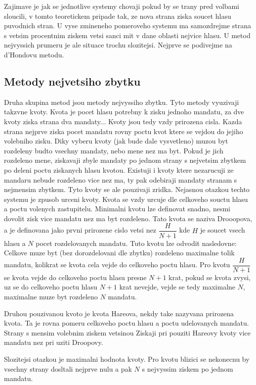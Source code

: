 \documentclass[12pt,a4paper]{report}
\begin{document}
Zajimave je jak se jednotlive systemy chovaji pokud by se trany pred volbami sloucili, v tomto teoretickem pripade tak, ze nova strana ziska soucet hlasu puvodnich stran.
U vyse zmineneho pomeroveho systemu ma samozdrejme strana s vetsim procentnim ziskem vetsi sanci mit v dane oblasti nejvice hlasu.
U metod nejvyssich prumeru je ale situace trochu slozitejsi.
Nejprve se podivejme na d'Hondovu metodu.




\subsection{Metody nejvetsiho zbytku}
Druha skupina metod jsou metody nejvyssiho zbytku.
Tyto metody vyuzivaji takzvne kvoty.
Kvota je pocet hlasu potrebny k zisku jednoho mandatu, za dve kvoty ziska strana dva mandaty...
Kvoty jsou tedy vzdy prirozena cisla.
Kazda strana nejprve ziska pocet mandatu rovny poctu kvot ktere se vejdou do jejiho volebniho zisku.
Diky vyberu kvoty (jak bude dale vysvetleno) muzou byt rozdeleny budto vsechny mandaty, nebo mene nez ma byt.
Pokud je jich rozdeleno mene, ziskavaji zbyle mandaty po jednom strany s nejvetsim zbytkem po deleni poctu ziskanych hlasu kvotou.
Existuji i kvoty ktere nezarucuji ze mandaru nebude rozdeleno vice nez ma, ty pak odebiraji mandaty stranam s nejmensim zbytkem.
Tyto kvoty se ale pouzivaji zridka.
Nejasnou otazkou techto systemu je zpusob urceni kvoty.
Kvota se vzdy urcuje dle celkoveho souctu hlasu a poctu volenych zastupitelu.
Minimalni kvotu lze definovat snadno, nesmi dovolit zisk vice mandatu nez ma byt rozdeleno.
Tato kvota se naziva Drooopova, a je definovana jako prvni prirozene cislo vetsi nez $\dfrac{H}{N+1}$ kde $H$ je soucet vsech hlasu a $N$ pocet rozdelovanych mandatu.
Tuto kvotu lze odvodit nasledovne: Celkove muze byt (bez dorozdelovani dle zbytku) rozdeleno maximalne tolik mandatu, kolikrat se kvota cela vejde do celkoveho poctu hlasu.
Pro kvotu $\dfrac{H}{N+1}$ se kvota vejde do celkoveho poctu hlasu presne $N+1$ krat, pokud se kvota zvysi, uz se do celkoveho poctu hlasu $N+1$ krat nevejde, vejde se tedy maximalne $N$, maximalne muze byt rozdeleno $N$ mandatu.

Druhou pouzivanou kvoto je kvota Hareova, nekdy take nazyvana prirozena kvota. Ta je rovna pomeru celkoveho poctu hlasu a poctu udelovanych mandatu.
Strany s mensim volebnim ziskem vetsinou Ziskaji pri pouziti Hareovy kvoty vice mandatu nez pri uziti Droopovy.  

Slozitejsi otazkou je maximalni hodnota kvoty.
Pro kvotu blizici se nekonecnu by vsechny strany dosltali nejprve nulu a pak $N$ s nejvyssim ziskem po jednom mandatu.
\end{document}
